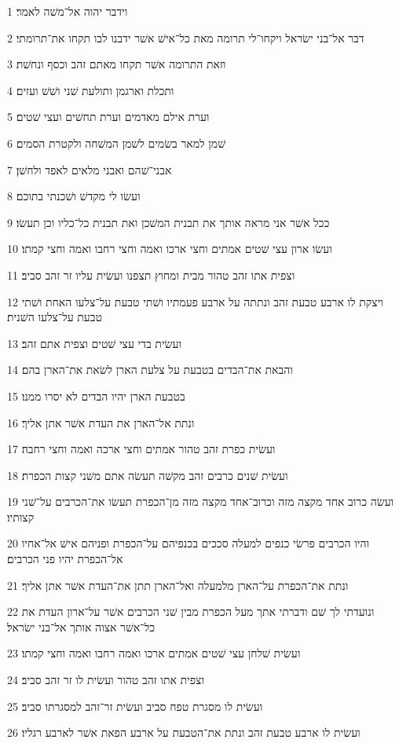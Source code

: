 \par 1 וידבר יהוה אל־משׁה לאמר׃
\par 2 דבר אל־בני ישׂראל ויקחו־לי תרומה מאת כל־אישׁ אשׁר ידבנו לבו תקחו את־תרומתי׃
\par 3 וזאת התרומה אשׁר תקחו מאתם זהב וכסף ונחשׁת׃
\par 4 ותכלת וארגמן ותולעת שׁני ושׁשׁ ועזים׃
\par 5 וערת אילם מאדמים וערת תחשׁים ועצי שׁטים׃
\par 6 שׁמן למאר בשׂמים לשׁמן המשׁחה ולקטרת הסמים׃
\par 7 אבני־שׁהם ואבני מלאים לאפד ולחשׁן׃
\par 8 ועשׂו לי מקדשׁ ושׁכנתי בתוכם׃
\par 9 ככל אשׁר אני מראה אותך את תבנית המשׁכן ואת תבנית כל־כליו וכן תעשׂו׃
\par 10 ועשׂו ארון עצי שׁטים אמתים וחצי ארכו ואמה וחצי רחבו ואמה וחצי קמתו׃
\par 11 וצפית אתו זהב טהור מבית ומחוץ תצפנו ועשׂית עליו זר זהב סביב׃
\par 12 ויצקת לו ארבע טבעת זהב ונתתה על ארבע פעמתיו ושׁתי טבעת על־צלעו האחת ושׁתי טבעת על־צלעו השׁנית׃
\par 13 ועשׂית בדי עצי שׁטים וצפית אתם זהב׃
\par 14 והבאת את־הבדים בטבעת על צלעת הארן לשׂאת את־הארן בהם׃
\par 15 בטבעת הארן יהיו הבדים לא יסרו ממנו׃
\par 16 ונתת אל־הארן את העדת אשׁר אתן אליך׃
\par 17 ועשׂית כפרת זהב טהור אמתים וחצי ארכה ואמה וחצי רחבה׃
\par 18 ועשׂית שׁנים כרבים זהב מקשׁה תעשׂה אתם משׁני קצות הכפרת׃
\par 19 ועשׂה כרוב אחד מקצה מזה וכרוב־אחד מקצה מזה מן־הכפרת תעשׂו את־הכרבים על־שׁני קצותיו׃
\par 20 והיו הכרבים פרשׂי כנפים למעלה סככים בכנפיהם על־הכפרת ופניהם אישׁ אל־אחיו אל־הכפרת יהיו פני הכרבים׃
\par 21 ונתת את־הכפרת על־הארן מלמעלה ואל־הארן תתן את־העדת אשׁר אתן אליך׃
\par 22 ונועדתי לך שׁם ודברתי אתך מעל הכפרת מבין שׁני הכרבים אשׁר על־ארון העדת את כל־אשׁר אצוה אותך אל־בני ישׂראל׃
\par 23 ועשׂית שׁלחן עצי שׁטים אמתים ארכו ואמה רחבו ואמה וחצי קמתו׃
\par 24 וצפית אתו זהב טהור ועשׂית לו זר זהב סביב׃
\par 25 ועשׂית לו מסגרת טפח סביב ועשׂית זר־זהב למסגרתו סביב׃
\par 26 ועשׂית לו ארבע טבעת זהב ונתת את־הטבעת על ארבע הפאת אשׁר לארבע רגליו׃

